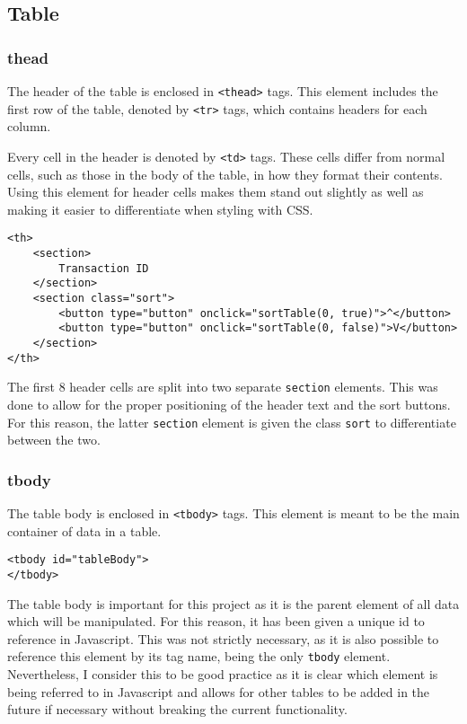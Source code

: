 \documentclass[letterpaper]{article}
\begin{document}
\subsection{Table}

\subsubsection{thead}

The header of the table is enclosed in \lstinline{<thead>} tags.
This element includes the first row of the table, denoted by \lstinline{<tr>} tags, which contains headers for each column.

Every cell in the header is denoted by \lstinline{<td>} tags.
These cells differ from normal cells, such as those in the body of the table, in how they format their contents.
Using this element for header cells makes them stand out slightly as well as making it easier to differentiate when styling with CSS.

\begin{lstlisting}[firstnumber=61]
<th>
    <section>
        Transaction ID
    </section>
    <section class="sort">
        <button type="button" onclick="sortTable(0, true)">^</button>
        <button type="button" onclick="sortTable(0, false)">V</button>
    </section>
</th>
\end{lstlisting}

The first 8 header cells are split into two separate \lstinline{section} elements.
This was done to allow for the proper positioning of the header text and the sort buttons.
For this reason, the latter \lstinline{section} element is given the class \lstinline{sort} to differentiate between the two.

\subsubsection{tbody}

The table body is enclosed in \lstinline{<tbody>} tags.
This element is meant to be the main container of data in a table.

\begin{lstlisting}
<tbody id="tableBody">
</tbody>
\end{lstlisting}

The table body is important for this project as it is the parent element of all data which will be manipulated.
For this reason, it has been given a unique id to reference in Javascript.
This was not strictly necessary, as it is also possible to reference this element by its tag name, being the only \lstinline{tbody} element.
Nevertheless, I consider this to be good practice as it is clear which element is being referred to in Javascript and allows for other tables to be added in the future if necessary without breaking the current functionality.
\end{document}
